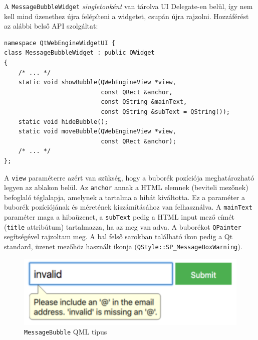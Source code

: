 \documentclass[12pt]{report}
\begin{document}
A \texttt{MessageBubbleWidget} \textit{singletonként} van tárolva UI Delegate-en belül,
így nem kell mind üzenethez újra felépíteni a widgetet, csupán újra rajzolni. Hozzáférést
az alábbi belső API szolgáltat:
\newpage
\begin{lstlisting}[title=src/webenginewidgets/ui/messagebubblewidget\_p.h]
namespace QtWebEngineWidgetUI {
class MessageBubbleWidget : public QWidget
{
    /* ... */
    static void showBubble(QWebEngineView *view,
                           const QRect &anchor,
                           const QString &mainText,
                           const QString &subText = QString());
    static void hideBubble();
    static void moveBubble(QWebEngineView *view,
                           const QRect &anchor);
    /* ... */
};
\end{lstlisting}
A \texttt{view} paraméterre azért van szükség, hogy a buborék pozíciója meghatározható legyen
az ablakon belül. Az \texttt{anchor} annak a HTML elemnek (beviteli mezőnek) befoglaló
téglalapja, amelynek a tartalma a hibát kiváltotta. Ez a paraméter a buborék pozíciójának és
méretének kiszámításához van felhasználva. A \texttt{mainText} paraméter maga a hibaüzenet,
a \texttt{subText} pedig a HTML input mező címét (\texttt{title} attribútum) tartalmazza, ha
az meg van adva. A buborékot \texttt{QPainter} segítségével rajzoltam meg. A bal felső
sarokban található ikon pedig a Qt standard, üzenet mezőhöz használt ikonja
(\texttt{QStyle::SP\_MessageBoxWarning}).

\begin{figure}[ht]
    \centering
    \includegraphics[scale=0.7]{bubi-quick-screenshot}
    \caption{
        \label{fig:bubi-quick-screenshot}
        \texttt{MessageBubble} QML típus
    }
\end{figure}
\end{document}
